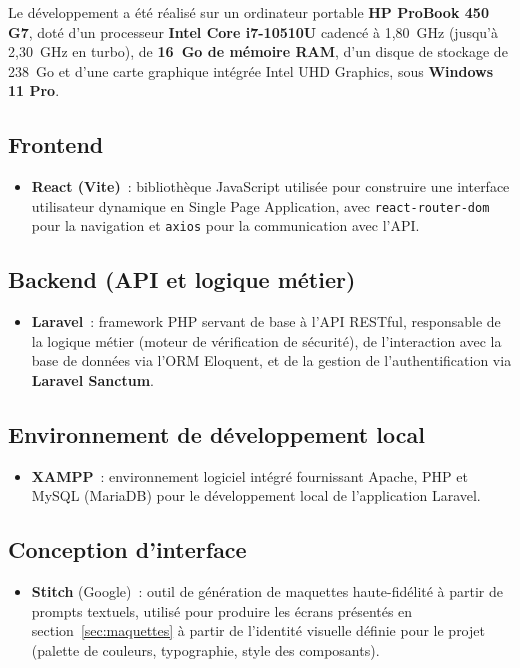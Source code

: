 Le d\'eveloppement a \'et\'e r\'ealis\'e sur un ordinateur portable \textbf{HP ProBook
450 G7}, dot\'e d'un processeur \textbf{Intel Core i7-10510U} cadenc\'e \`a
1,80~GHz (jusqu'\`a 2,30~GHz en turbo), de \textbf{16~Go de m\'emoire RAM}, d'un
disque de stockage de 238~Go et d'une carte graphique int\'egr\'ee Intel UHD
Graphics, sous \textbf{Windows 11 Pro}.

\subsection{Frontend}
\begin{itemize}
  \item \textbf{React (Vite)}~: biblioth\`eque JavaScript utilis\'ee pour construire
    une interface utilisateur dynamique en Single Page Application, avec
    \texttt{react-router-dom} pour la navigation et \texttt{axios} pour la
    communication avec l'API.
\end{itemize}

\subsection{Backend (API et logique m\'etier)}
\begin{itemize}
  \item \textbf{Laravel}~: framework PHP servant de base \`a l'API RESTful,
    responsable de la logique m\'etier (moteur de v\'erification de s\'ecurit\'e), de
    l'interaction avec la base de donn\'ees via l'ORM Eloquent, et de la gestion
    de l'authentification via \textbf{Laravel Sanctum}.
\end{itemize}

\subsection{Environnement de d\'eveloppement local}
\begin{itemize}
  \item \textbf{XAMPP}~: environnement logiciel int\'egr\'e fournissant Apache, PHP
    et MySQL (MariaDB) pour le d\'eveloppement local de l'application Laravel.
\end{itemize}

\subsection{Conception d'interface}
\begin{itemize}
  \item \textbf{Stitch} (Google)~: outil de g\'en\'eration de maquettes haute-fid\'elit\'e \`a
    partir de prompts textuels, utilis\'e pour produire les \'ecrans pr\'esent\'es en
    section~\ref{sec:maquettes} \`a partir de l'identit\'e visuelle d\'efinie pour le
    projet (palette de couleurs, typographie, style des composants).
\end{itemize}

